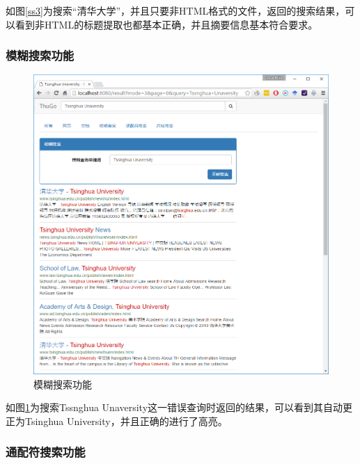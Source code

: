 \documentclass[paper=a4, fontsize=11pt, UTF8]{article} %
\numberwithin{equation}{section} %
\numberwithin{figure}{section} %
\numberwithin{table}{section} %
\begin{document}
如图\ref{ss3}为搜索“清华大学”，并且只要非HTML格式的文件，返回的搜索结果，可以看到非HTML的标题提取也都基本正确，并且摘要信息基本符合要求。

\subsubsection{模糊搜索功能}

\begin{figure}[htp]
\center
\includegraphics[width=\textwidth]{ss4}
\caption{模糊搜索功能} \label{ss4}
\end{figure}

如图\ref{ss4}为搜索Tssnghua Unaversity这一错误查询时返回的结果，可以看到其自动更正为Tsinghua University，并且正确的进行了高亮。

\subsubsection{通配符搜索功能}
\end{document}
